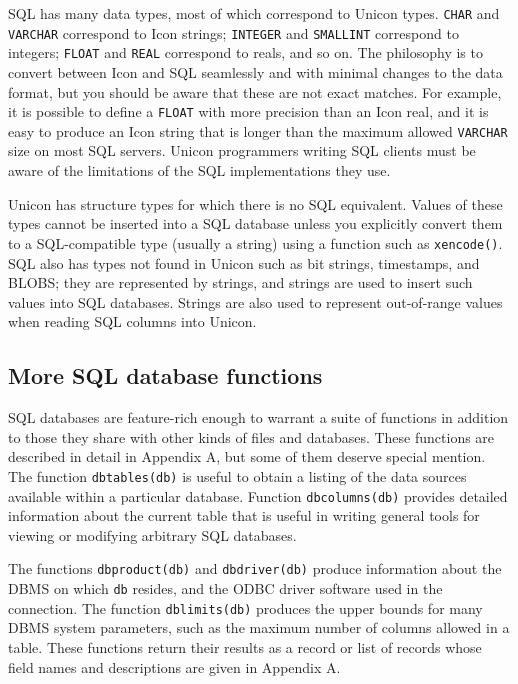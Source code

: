 SQL has many data types, most of which correspond to Unicon types.
\texttt{CHAR} and \texttt{VARCHAR} correspond to Icon
strings; \texttt{INTEGER} and \texttt{SMALLINT} correspond to integers;
\texttt{FLOAT} and \texttt{REAL} correspond to reals, and so on. The
philosophy is to convert between Icon and SQL seamlessly and with
minimal changes to the data format, but you should be aware that these
are not exact matches. For example, it is possible to define a
\texttt{FLOAT} with more precision than an Icon real, and it is easy to
produce an Icon string that is longer than the maximum allowed
\texttt{VARCHAR} size on most SQL servers. Unicon programmers writing
SQL clients must be aware of the limitations of the SQL implementations
they use.

Unicon has structure types for which there is no SQL equivalent. Values
of these types cannot be inserted into a SQL database unless you
explicitly convert them to a SQL-compatible type (usually a string)
using a function such as \texttt{xencode()}.
SQL also has types not found in Unicon such as bit
strings, timestamps, and BLOBS; they are represented
by strings, and strings are used to insert such values into SQL
databases. Strings are also used to represent out-of-range values when
reading SQL columns into Unicon.

\subsection{More SQL database functions}

SQL databases are feature-rich enough to warrant a suite
of functions in addition to those they
share with other kinds of files and databases. These functions are
described in detail in Appendix A, but some of them deserve special
mention. The function \texttt{dbtables(db)} is useful to obtain a
listing of the data sources available within a particular database.
Function \texttt{dbcolumns(db)} provides detailed information about the
current table that is useful in writing general tools for viewing or
modifying arbitrary SQL databases.

The functions \texttt{dbproduct(db)} and \texttt{dbdriver(db)} produce
information about the DBMS on which \texttt{db} resides, and the
ODBC driver software used in the connection.
The function \texttt{dblimits(db)} produces the upper bounds for many
DBMS system parameters, such as the maximum number of columns allowed
in a table. These functions return their results as
a record or list of records whose field names and descriptions
are given in Appendix A.

